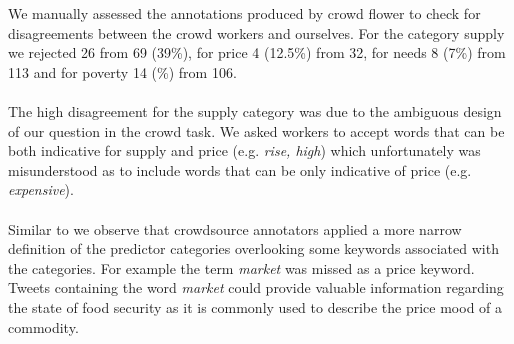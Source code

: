 We manually assessed the annotations produced by crowd flower to check for disagreements between the crowd workers and ourselves. For the category supply we rejected 26 from 69 (39\%), for price 4 (12.5\%) from 32, for needs 8 (7\%) from 113 and for poverty 14 (\%) from 106. \\
\\
The high disagreement for the supply category was due to the ambiguous design of our question in the crowd task. We asked workers to accept words that can be both indicative for supply and price (e.g. \emph{rise, high}) which unfortunately was misunderstood as to include words that can be only indicative of price (e.g. \emph{expensive}). \\
\\
Similar to \cite{olt15} we observe that crowdsource annotators applied a more narrow definition of the predictor categories overlooking some keywords associated with the categories. For example the term \emph{market} was missed as a price keyword. Tweets containing the word \emph{market} could provide valuable information regarding the state of food security as it is commonly used to describe the price  mood of a commodity. \\
\\



